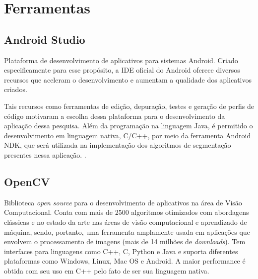 %
%
% 
%
\chapter{Ferramentas}\label{cap:ferramentas}
\noindent
\section{Android Studio}
Plataforma de desenvolvimento de aplicativos para sistemas Android. Criado especificamente para esse propósito, a IDE oficial do Android oferece diversos recursos que aceleram o desenvolvimento e aumentam a qualidade dos aplicativos criados.

Tais recursos como ferramentas de edição, depuração, testes e geração de perfis de código motivaram a escolha dessa plataforma para o desenvolvimento da aplicação dessa pesquisa. Além da programação na linguagem Java, é permitido o desenvolvimento em linguagem nativa, C/C++, por meio da ferramenta Android NDK, que será utilizada na implementação dos algoritmos de segmentação presentes nessa aplicação. \citep{androidstudio}.

\section{OpenCV}\label{sec:opencv}
Biblioteca \textit{open source} para o desenvolvimento de aplicativos na área de Visão Computacional. Conta com mais de 2500 algoritmos otimizados com abordagens clássicas e no estado da arte nas áreas de visão computacional e aprendizado de máquina, sendo, portanto, uma ferramenta amplamente usada em aplicações que envolvem o processamento de imagens (mais de 14 milhões de \textit{downloads}). Tem interfaces para linguagens como C++, C, Python e Java e suporta diferentes plataformas como Windows, Linux, Mac OS e Android. A maior performance é obtida com seu uso em C++ pelo fato de ser sua linguagem nativa. \citep{opencv}

